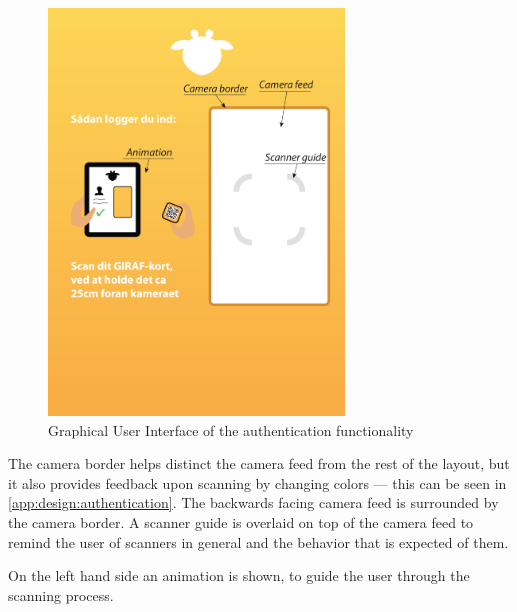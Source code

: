 \begin{figure}[h]
	\centering
	\includegraphics[width=0.7\textwidth]{gfx/authentication_gui_design_init.pdf}
	\caption{Graphical User Interface of the authentication functionality}
	\label{fig:authentication_gui_design_init}
\end{figure}

The camera border helps distinct the camera feed from the rest of the layout, but it also provides feedback upon scanning by changing colors --- this can be seen in \autoref{app:design:authentication}. 
The backwards facing camera feed is surrounded by the camera border. 
A scanner guide is overlaid on top of the camera feed to remind the user of scanners in general and the behavior that is expected of them.

On the left hand side an animation is shown, to guide the user through the scanning process. 